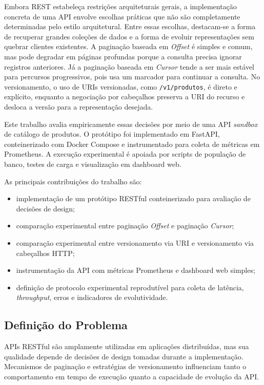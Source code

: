 \documentclass[journal]{IEEEtran}
\begin{document}
Embora REST estabeleça restrições arquiteturais gerais, a implementação concreta de uma API envolve escolhas práticas que não são completamente determinadas pelo estilo arquitetural. Entre essas escolhas, destacam-se a forma de recuperar grandes coleções de dados e a forma de evoluir representações sem quebrar clientes existentes. A paginação baseada em \textit{Offset} é simples e comum, mas pode degradar em páginas profundas porque a consulta precisa ignorar registros anteriores. Já a paginação baseada em \textit{Cursor} tende a ser mais estável para percursos progressivos, pois usa um marcador para continuar a consulta. No versionamento, o uso de URIs versionadas, como \texttt{/v1/produtos}, é direto e explícito, enquanto a negociação por cabeçalhos preserva a URI do recurso e desloca a versão para a representação desejada.

Este trabalho avalia empiricamente essas decisões por meio de uma API \textit{sandbox} de catálogo de produtos. O protótipo foi implementado em FastAPI, conteinerizado com Docker Compose e instrumentado para coleta de métricas em Prometheus. A execução experimental é apoiada por scripts de população de banco, testes de carga e visualização em dashboard web.

As principais contribuições do trabalho são:

\begin{itemize}
    \item implementação de um protótipo RESTful conteinerizado para avaliação de decisões de design;
    \item comparação experimental entre paginação \textit{Offset} e paginação \textit{Cursor};
    \item comparação experimental entre versionamento via URI e versionamento via cabeçalhos HTTP;
    \item instrumentação da API com métricas Prometheus e dashboard web simples;
    \item definição de protocolo experimental reprodutível para coleta de latência, \textit{throughput}, erros e indicadores de evolutividade.
\end{itemize}

\subsection{Definição do Problema}

APIs RESTful são amplamente utilizadas em aplicações distribuídas, mas sua qualidade depende de decisões de design tomadas durante a implementação. Mecanismos de paginação e estratégias de versionamento influenciam tanto o comportamento em tempo de execução quanto a capacidade de evolução da API.
\end{document}
